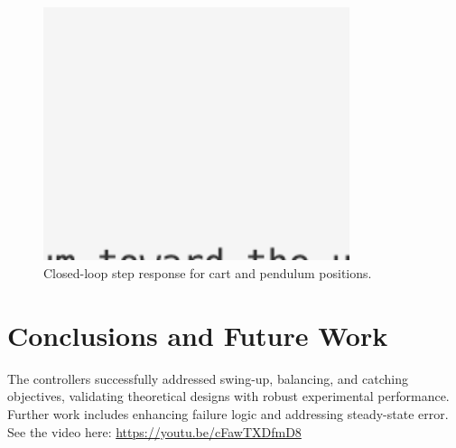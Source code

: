 \documentclass[12pt]{article}
\begin{document}
\begin{figure}[H]
    \centering
    \includegraphics[width=0.8\textwidth]{figures/ph.png}
    \caption{Closed-loop step response for cart and pendulum positions.}
    \label{fig:step_response}
\end{figure}


\section{Conclusions and Future Work}
The controllers successfully addressed swing-up, balancing, and catching objectives, validating theoretical designs with robust experimental performance. Further work includes enhancing failure logic and addressing steady-state error. See the video here: \href{https://youtu.be/cFawTXDfmD8}{https://youtu.be/cFawTXDfmD8}




\end{document}
